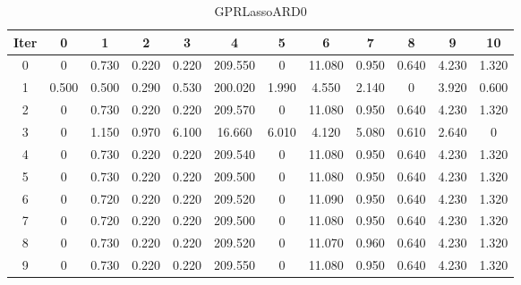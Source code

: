 \begin{table}
	\begin{center}
		\begin{tabular}{|c|c|c|c|c|c|c|c|c|c|c|c|}
			\hline
			Iter & 0 & 1 & 2 & 3 & 4 & 5 & 6 & 7 & 8 & 9 & 10 \\
			\hline
			0 & 0 & 0.730 & 0.220 & 0.220 & 209.550 & 0 & 11.080 & 0.950 & 0.640 & 4.230 & 1.320 \\
			\hline
			1 & 0.500 & 0.500 & 0.290 & 0.530 & 200.020 & 1.990 & 4.550 & 2.140 & 0 & 3.920 & 0.600 \\
			\hline
			2 & 0 & 0.730 & 0.220 & 0.220 & 209.570 & 0 & 11.080 & 0.950 & 0.640 & 4.230 & 1.320 \\
			\hline
			3 & 0 & 1.150 & 0.970 & 6.100 & 16.660 & 6.010 & 4.120 & 5.080 & 0.610 & 2.640 & 0 \\
			\hline
			4 & 0 & 0.730 & 0.220 & 0.220 & 209.540 & 0 & 11.080 & 0.950 & 0.640 & 4.230 & 1.320 \\
			\hline
			5 & 0 & 0.730 & 0.220 & 0.220 & 209.500 & 0 & 11.080 & 0.950 & 0.640 & 4.230 & 1.320 \\
			\hline
			6 & 0 & 0.720 & 0.220 & 0.220 & 209.520 & 0 & 11.090 & 0.950 & 0.640 & 4.230 & 1.320 \\
			\hline
			7 & 0 & 0.720 & 0.220 & 0.220 & 209.500 & 0 & 11.080 & 0.950 & 0.640 & 4.230 & 1.320 \\
			\hline
			8 & 0 & 0.730 & 0.220 & 0.220 & 209.520 & 0 & 11.070 & 0.960 & 0.640 & 4.230 & 1.320 \\
			\hline
			9 & 0 & 0.730 & 0.220 & 0.220 & 209.550 & 0 & 11.080 & 0.950 & 0.640 & 4.230 & 1.320 \\
			\hline
		\end{tabular}
	\end{center}
	\caption{GPRLassoARD0}
\end{table}